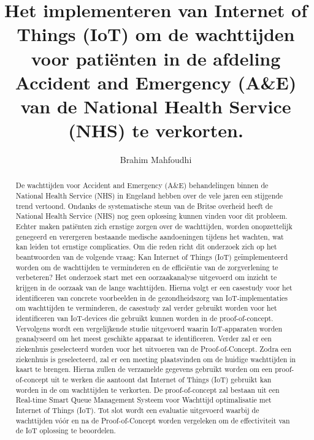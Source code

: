 \documentclass{hogent-article}
\title{Het implementeren van Internet of Things (IoT) om de wachttijden voor patiënten in de afdeling Accident and Emergency (A\&E) van de National Health Service (NHS) te verkorten.}
\author{Brahim Mahfoudhi}
\begin{document}
\begin{abstract}
De wachttijden voor Accident and Emergency (A\&E) behandelingen binnen de National Health Service (NHS) in Engeland hebben over de vele jaren een stijgende trend vertoond. Ondanks de systematische steun van de Britse overheid heeft de National Health Service (NHS) nog geen oplossing kunnen vinden voor dit probleem. Echter maken patiënten zich ernstige zorgen over de wachttijden, worden onopzettelijk genegeerd en verergeren bestaande medische aandoeningen tijdens het wachten, wat kan leiden tot ernstige complicaties. Om die reden richt dit onderzoek zich op het beantwoorden van de volgende vraag: Kan Internet of Things (IoT) geïmplementeerd worden om de wachttijden te verminderen en de efficiëntie van de zorgverlening te verbeteren?  Het onderzoek start met een oorzaakanalyse uitgevoerd om inzicht te krijgen in de oorzaak van de lange wachttijden. Hierna volgt er een casestudy voor het identificeren van concrete voorbeelden in de gezondheidszorg van IoT-implementaties om wachttijden te verminderen, de casestudy zal verder gebruikt worden voor het identificeren van IoT-devices die gebruikt kunnen worden in de proof-of-concept. Vervolgens wordt een vergelijkende studie uitgevoerd waarin IoT-apparaten worden geanalyseerd om het meest geschikte apparaat te identificeren. Verder zal er een ziekenhuis geselecteerd worden voor het uitvoeren van de Proof-of-Concept. Zodra een ziekenhuis is geselecteerd, zal er een meeting plaatsvinden om de huidige wachttijden in kaart te brengen. Hierna zullen de verzamelde gegevens gebruikt worden om een proof-of-concept uit te werken die aantoont dat Internet of Things (IoT) gebruikt kan worden in de om wachttijden te verkorten. De proof-of-concept zal bestaan uit een Real-time Smart Queue Management Systeem voor Wachttijd optimalisatie met Internet of Things (IoT). Tot slot wordt een evaluatie uitgevoerd waarbij de wachttijden vóór en na de Proof-of-Concept worden vergeleken om de effectiviteit van de IoT oplossing te beoordelen.
\end{abstract}

\tableofcontents



\printbibliography[heading=bibintoc]
\end{document}
